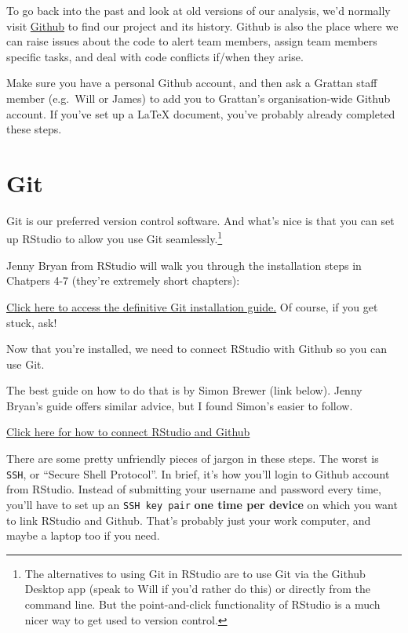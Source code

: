 \documentclass[
]{book}
\begin{document}
To go back into the past and look at old versions of our analysis, we'd normally visit \href{http://github.com}{Github} to find our project and its history. Github is also the place where we can raise issues about the code to alert team members, assign team members specific tasks, and deal with code conflicts if/when they arise.

Make sure you have a personal Github account, and then ask a Grattan staff member (e.g.~Will or James) to add you to Grattan's organisation-wide Github account. If you've set up a LaTeX document, you've probably already completed these steps.

\hypertarget{git}{%
\section{Git}\label{git}}

Git is our preferred version control software. And what's nice is that you can set up RStudio to allow you use Git seamlessly.\footnote{The alternatives to using Git in RStudio are to use Git via the Github Desktop app (speak to Will if you'd rather do this) or directly from the command line. But the point-and-click functionality of RStudio is a much nicer way to get used to version control.}

Jenny Bryan from RStudio will walk you through the installation steps in Chatpers 4-7 (they're extremely short chapters):

\href{https://happygitwithr.com/install-intro.html}{Click here to access the definitive Git installation guide.}
Of course, if you get stuck, ask!

Now that you're installed, we need to connect RStudio with Github so you can use Git.

The best guide on how to do that is by Simon Brewer (link below). Jenny Bryan's guide offers similar advice, but I found Simon's easier to follow.

\href{http://rstudio-pubs-static.s3.amazonaws.com/485236_9e71a253a02748cba293213a8aec5fe8.html}{Click here for how to connect RStudio and Github}

There are some pretty unfriendly pieces of jargon in these steps. The worst is \texttt{SSH}, or ``Secure Shell Protocol''. In brief, it's how you'll login to Github account from RStudio. Instead of submitting your username and password every time, you'll have to set up an \texttt{SSH\ key\ pair} \textbf{one time per device} on which you want to link RStudio and Github. That's probably just your work computer, and maybe a laptop too if you need.
\end{document}
